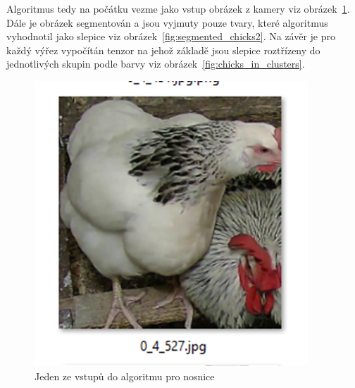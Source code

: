 Algoritmus tedy na počátku vezme jako vstup obrázek z kamery viz obrázek~\ref{fig:source_chick_image}.
Dále je obrázek segmentován a jsou vyjmuty pouze tvary, které algoritmus vyhodnotil jako slepice viz obrázek~\ref{fig:segmented_chicks2}.
Na závěr je pro každý výřez vypočítán tenzor na jehož základě jsou slepice roztřízeny do jednotlivých skupin podle barvy viz obrázek~\ref{fig:chicks_in_clusters}.

\begin{figure}[h]
    \centering
    \includegraphics[width=\textwidth]{img/source_chick_image}
    \caption{Jeden ze vstupů do algoritmu pro nosnice}
    \label{fig:source_chick_image}
\end{figure}


